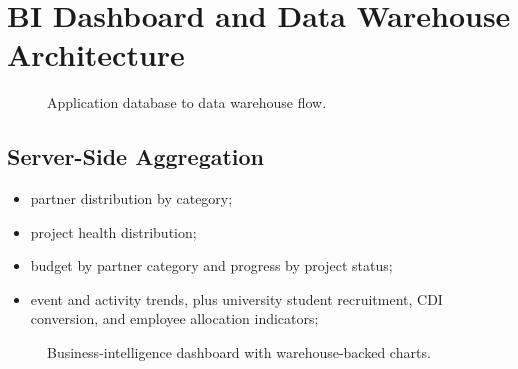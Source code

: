 \section{BI Dashboard and Data Warehouse Architecture}
\begin{figure}[htbp]
  \centering
  \caption{Application database to data warehouse flow.}
\end{figure}
\subsection{Server-Side Aggregation}
\begin{itemize}
  \item partner distribution by category;
  \item project health distribution;
  \item budget by partner category and progress by project status;
  \item event and activity trends, plus university student recruitment, CDI conversion, and employee allocation indicators;
\end{itemize}
\begin{figure}[htbp]
  \centering
  \caption{Business-intelligence dashboard with warehouse-backed charts.}
\end{figure}
